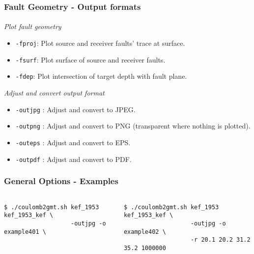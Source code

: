 \begin{frame}
  \frametitle{Fault Geometry - Output formats}
  \framesubtitle{}
  \label{ch4fr:faultopt}

\emph{Plot fault geometry}

\begin{scriptsize}
\begin{itemize}
\item
  \texttt{-fproj}: Plot source and receiver faults' trace at surface.
\item
  \texttt{-fsurf}: Plot surface of source and receiver faults.
\item
  \texttt{-fdep}: Plot intersection of target depth with fault plane.
\end{itemize}
\end{scriptsize}

\emph{Adjust and convert output format}
\begin{scriptsize}
\begin{itemize}
\item
  \texttt{-outjpg} : Adjust and convert to JPEG.
\item
  \texttt{-outpng} : Adjust and convert to PNG (transparent where
  nothing is plotted).
\item
  \texttt{-outeps} : Adjust and convert to EPS.
\item
  \texttt{-outpdf} : Adjust and convert to PDF.
\end{itemize}
\end{scriptsize}
\end{frame}
\note{}

\begin{frame}[t,fragile]
  \frametitle{General Options - Examples}
  \framesubtitle{}
  \label{ch4fr:ex401_2}
\begin{columns}[t]
  \begin{column}{.5\textwidth}
\begin{scriptsize}
\begin{verbatim}
$ ./coulomb2gmt.sh kef_1953 kef_1953_kef \
                   -outjpg -o example401 \
\end{verbatim}
\end{scriptsize}
\centering
  \end{column}
  \begin{column}{.5\textwidth}
  \begin{scriptsize}
\begin{verbatim}
$ ./coulomb2gmt.sh kef_1953 kef_1953_kef \
                   -outjpg -o example402 \
                   -r 20.1 20.2 31.2 35.2 1000000
\end{verbatim}
\end{scriptsize}
\centering
  \end{column}
\end{columns}

\end{frame}
\note{}

